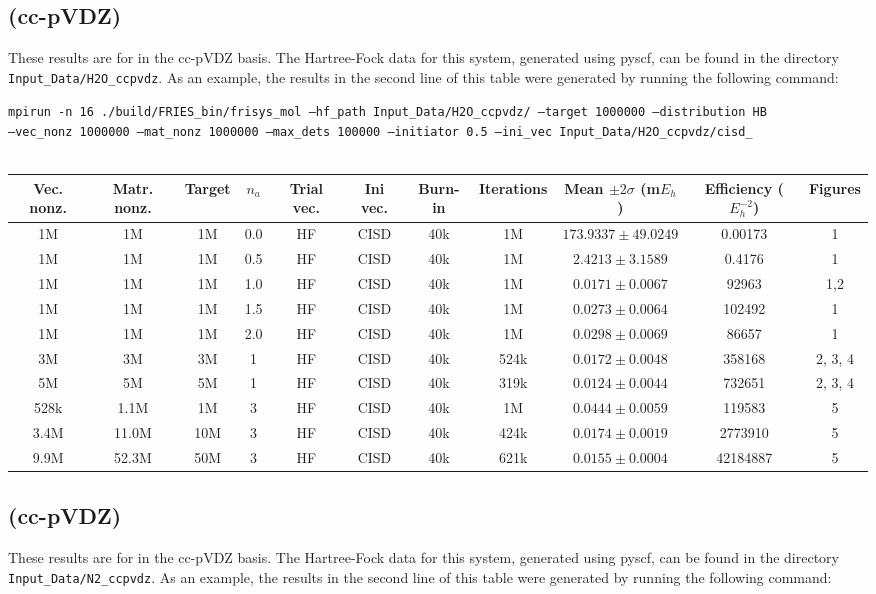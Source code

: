 \documentclass[12pt, landscape]{article}
\begin{document}
\subsection*{ (cc-pVDZ)}
These results are for  in the cc-pVDZ basis. The Hartree-Fock data for this system, generated using pyscf, can be found in the directory \texttt{Input\_Data/H2O\_ccpvdz}. As an example, the results in the second line of this table were generated by running the following command:

\texttt{mpirun -n 16 ./build/FRIES\_bin/frisys\_mol --hf\_path Input\_Data/H2O\_ccpvdz/ --target 1000000 --distribution HB}\\ \texttt{--vec\_nonz 1000000 --mat\_nonz 1000000 --max\_dets 100000 --initiator 0.5 --ini\_vec Input\_Data/H2O\_ccpvdz/cisd\_}
\\~\\
\begin{tabular}{c|c|c|c|c|c|c|c|c|c|c}
Vec. nonz. & Matr. nonz. & Target & $n_a$ & Trial vec. & Ini vec. & Burn-in & Iterations & Mean $\pm 2 \sigma$ (m$E_h$) & Efficiency ($E_h^{-2}$) & Figures \\ \hline
1M & 1M & 1M & 0.0 & HF & CISD & 40k & 1M & $173.9337 \pm 49.0249$ & 0.00173 & 1 \\
1M & 1M & 1M & 0.5 & HF & CISD & 40k & 1M & $2.4213 \pm 3.1589$ & 0.4176 & 1 \\
1M & 1M & 1M & 1.0 & HF & CISD & 40k & 1M & $0.0171 \pm 0.0067$ & 92963 & 1,2 \\
1M & 1M & 1M & 1.5 & HF & CISD & 40k & 1M & $0.0273 \pm 0.0064$ & 102492 & 1 \\
1M & 1M & 1M & 2.0 & HF & CISD & 40k & 1M & $0.0298 \pm 0.0069$ & 86657 & 1 \\
3M & 3M & 3M & 1 & HF & CISD & 40k & 524k & $0.0172 \pm 0.0048$ & 358168 & 2, 3, 4\\
5M & 5M & 5M & 1 & HF & CISD & 40k & 319k & $0.0124 \pm 0.0044$ & 732651 & 2, 3, 4\\
528k & 1.1M & 1M & 3 & HF & CISD & 40k & 1M & $0.0444 \pm 0.0059$ & 119583 & 5 \\
3.4M & 11.0M & 10M & 3 & HF & CISD & 40k &424k & $0.0174 \pm 0.0019$ & 2773910 & 5 \\
9.9M & 52.3M & 50M & 3 & HF & CISD & 40k & 621k & $0.0155 \pm 0.0004$ & 42184887 & 5 \\
\end{tabular}


\subsection*{ (cc-pVDZ)}
These results are for  in the cc-pVDZ basis. The Hartree-Fock data for this system, generated using pyscf, can be found in the directory \texttt{Input\_Data/N2\_ccpvdz}. As an example, the results in the second line of this table were generated by running the following command:
\end{document}
